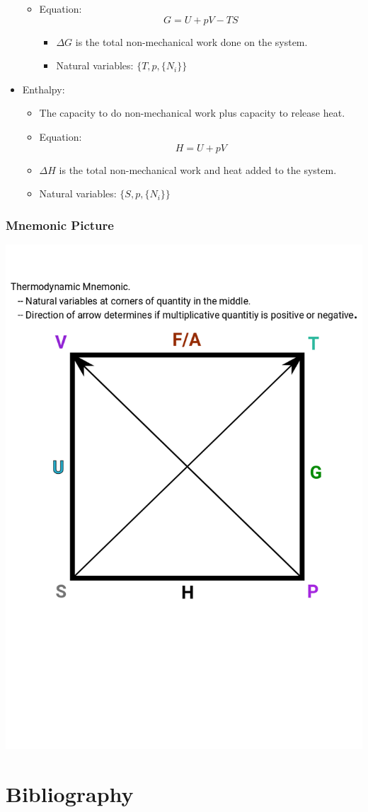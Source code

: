 \documentclass[11pt]{article}
\begin{document}
\begin{itemize}
\begin{itemize}
\item Equation: \[ G = U + pV - TS  \]
\begin{itemize}
\item \(\Delta G\) is the total non-mechanical work done on the system.
\item Natural variables: \(\{ T, p, \{N_{i}\} \}\)
\end{itemize}
\end{itemize}
\item Enthalpy:
\begin{itemize}
\item The capacity to do non-mechanical work plus capacity to release heat.
\item Equation: \[ H = U + pV \]
\item \(\Delta H\) is the total non-mechanical work and heat added to the
system.
\item Natural variables: \(\{ S, p, \{N_{i}\} \}\)
\end{itemize}
\end{itemize}

\subsubsection{Mnemonic Picture}
\label{sec:orgf97701b}
\begin{center}
\includegraphics[width=.9\linewidth]{Images/Thermodynamic_mnemonic.png}
\end{center}


\section{Bibliography}
\label{sec:orga7fa8de}
\label{org579a319}



\end{document}
